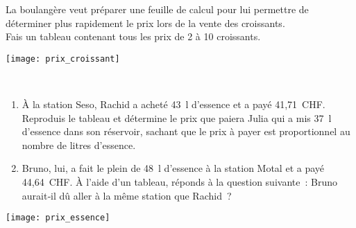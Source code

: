 \begin{activite}

\begin{partie}[À la boulangerie]
\begin{minipage}[c]{0.58\linewidth}
La boulangère veut préparer une feuille de calcul pour lui permettre de déterminer plus rapidement le prix lors de la vente des croissants. \\[0.5em]
Fais un tableau contenant tous les prix de 2 à 10 croissants.
 \end{minipage} \hfill%
 \begin{minipage}[c]{0.38\linewidth}
  \texttt{[image: prix\_croissant]}
  \end{minipage} \\
\end{partie}

\begin{partie}
\begin{minipage}[c]{0.58\linewidth}
\begin{enumerate}
 \item À la station Seso, Rachid a acheté 43 l d'essence et a payé 41,71 CHF. Reproduis le tableau et détermine le prix que paiera Julia qui a mis 37 l d'essence dans son réservoir, sachant que le prix à payer est proportionnel au nombre de litres d'essence.
 \item Bruno, lui, a fait le plein de 48 l d'essence à la station Motal et a payé 44,64 CHF. À l'aide d'un tableau, réponds à la question suivante : Bruno aurait‑il dû aller à la même station que Rachid ?
 \end{enumerate}
 \end{minipage} \hfill%
 \begin{minipage}[c]{0.38\linewidth}
  \texttt{[image: prix\_essence]}
  \end{minipage} \\
\end{partie}

\end{activite}


